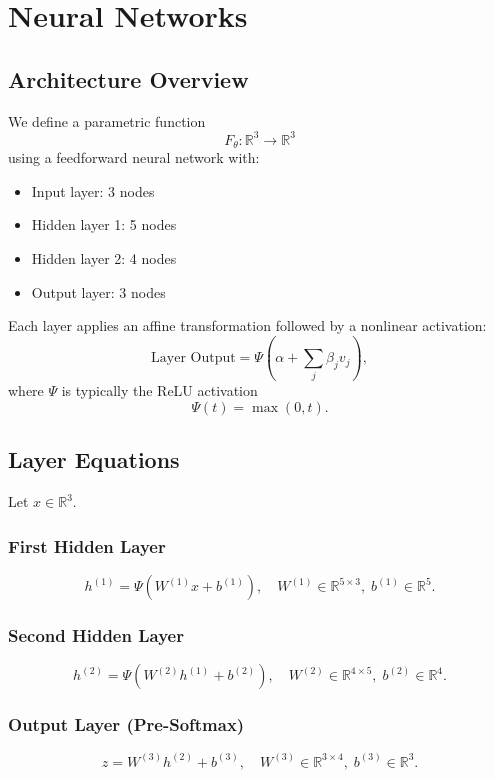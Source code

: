 \documentclass[12pt,oneside]{book}
\numberwithin{equation}{section}
\theoremstyle{definition}
\theoremstyle{plain}
\theoremstyle{remark}
\newcommand{\R}{\mathbb{R}}
\begin{document}
\chapter{Neural Networks}

\section{Architecture Overview}

We define a parametric function
\[
F_\theta:\R^3 \to \R^3
\]
using a feedforward neural network with:

\begin{itemize}
\item Input layer: 3 nodes  
\item Hidden layer 1: 5 nodes  
\item Hidden layer 2: 4 nodes  
\item Output layer: 3 nodes  
\end{itemize}

Each layer applies an affine transformation followed by a nonlinear activation:
\[
\text{Layer Output} = \Psi\!\left(\alpha + \sum_j \beta_j v_j\right),
\]
where $\Psi$ is typically the ReLU activation
\[
\Psi(t) = \max(0,t).
\]

\section{Layer Equations}

Let $x \in \R^3$.

\subsection{First Hidden Layer}

\[
h^{(1)} = \Psi(W^{(1)} x + b^{(1)}), \quad W^{(1)} \in \R^{5 \times 3}, \; b^{(1)} \in \R^5.
\]

\subsection{Second Hidden Layer}

\[
h^{(2)} = \Psi(W^{(2)} h^{(1)} + b^{(2)}), \quad W^{(2)} \in \R^{4 \times 5}, \; b^{(2)} \in \R^4.
\]

\subsection{Output Layer (Pre-Softmax)}

\[
z = W^{(3)} h^{(2)} + b^{(3)}, \quad W^{(3)} \in \R^{3 \times 4}, \; b^{(3)} \in \R^3.
\]
\end{document}
